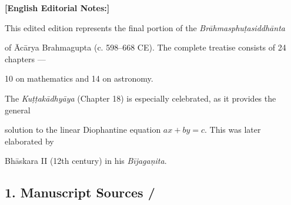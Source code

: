 \documentclass[10pt,a4paper]{article}
\begin{document}
\begin{minipage}[t]{0.47\textwidth}


\end{minipage}%

\hfill\vline\hfill%

\begin{minipage}[t]{0.47\textwidth}

\textbf{[English Editorial Notes:]}

This edited edition represents the final portion of the \textit{Brāhmasphuṭasiddhānta}

of Ācārya Brahmagupta (c. 598--668 CE). The complete treatise consists of 24 chapters ---

10 on mathematics and 14 on astronomy.



The \textit{Kuṭṭakādhyāya} (Chapter 18) is especially celebrated, as it provides the general

solution to the linear Diophantine equation $ax + by = c$. This was later elaborated by

Bhāskara II (12th century) in his \textit{Bījagaṇita}.

\end{minipage}



\vspace{2em}



\subsection*{1. Manuscript Sources / }
\end{document}
